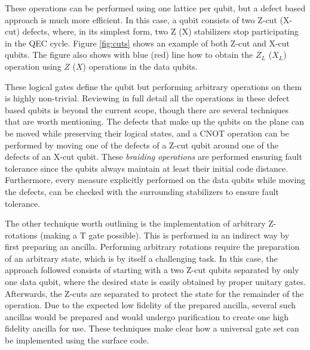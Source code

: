 These operations can be performed using one lattice per qubit, but a defect
based approach is much more efficient. In this case, a qubit consists of two
Z-cut (X-cut) defects, where, in its simplest form, two Z (X) stabilizers stop
participating in the QEC cycle. Figure \ref{fig:cuts} shows an example of both
Z-cut and X-cut qubits. The figure also shows with blue (red) line how to obtain
the $Z_L$ ($X_L$) operation using $Z$ ($X$) operations in the data qubits.

These logical gates define the qubit but performing arbitrary operations on them
is highly non-trivial. Reviewing in full detail all the operations in these
defect based qubits is beyond the current scope, though there are several
techniques that are worth mentioning. The defects that make up the qubits on the
plane can be moved while preserving their logical states, and a CNOT operation
can be performed by moving one of the defects of a Z-cut qubit around one of the
defects of an X-cut qubit. These \textit{braiding operations} are performed
ensuring fault tolerance since the qubits always maintain at least their initial
code distance. Furthermore, every measure explicitly performed on the data
qubits while moving the defects, can be checked with the surrounding stabilizers
to ensure fault tolerance.

The other technique worth outlining is the implementation of arbitrary
Z-rotations (making a T gate possible). This is performed in an indirect way by
first preparing an ancilla. Performing arbitrary rotations require the
preparation of an arbitrary state, which is by itself a challenging task. In
this case, the approach followed consists of starting with a two Z-cut qubits
separated by only one data qubit, where the desired state is easily obtained by
proper unitary gates. Afterwards, the Z-cuts are separated to protect the state
for the remainder of the operation. Due to the expected low fidelity of the
prepared ancilla, several such ancillas would be prepared and would undergo
purification to create one high fidelity ancilla for use. These techniques make
clear how a universal gate set can be implemented using the surface code.


